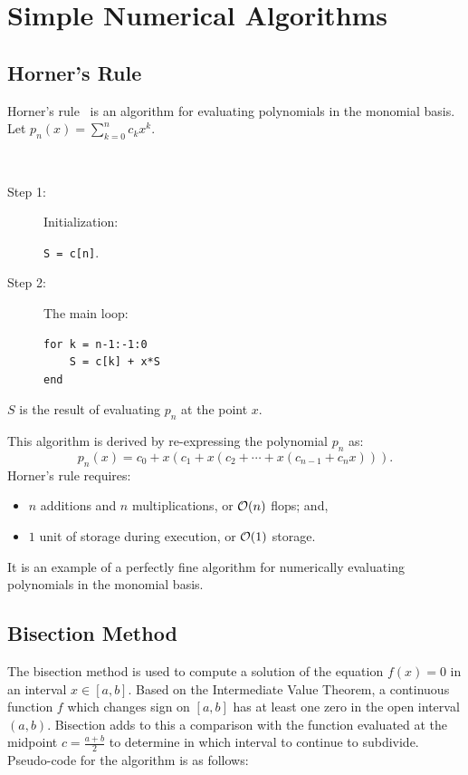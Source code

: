 \section{Simple Numerical Algorithms}

\subsection{Horner's Rule}

Horner's rule~\cite{Horner-109-308-19} is an algorithm for evaluating polynomials in the monomial basis. Let $p_n(x) = \sum_{k=0}^n c_kx^k$.
\begin{algorithm}~
\begin{description}
\item[Step 1:] Initialization:

{\tt S = c[n]}.
\item[Step 2:] The main loop:
\begin{verbatim}
for k = n-1:-1:0
    S = c[k] + x*S
end
\end{verbatim}
\end{description}
$S$ is the result of evaluating $p_n$ at the point $x$.
\end{algorithm}
This algorithm is derived by re-expressing the polynomial $p_n$ as:
\[
p_n(x) = c_0 + x(c_1 + x(c_2 + \cdots + x(c_{n-1}+c_nx))).
\]
Horner's rule requires:
\begin{itemize}
\item $n$ additions and $n$ multiplications, or $\mathcal{O}(n)$ flops; and,
\item $1$ unit of storage during execution, or $\mathcal{O}(1)$ storage.
\end{itemize}
It is an example of a perfectly fine algorithm for numerically evaluating polynomials in the monomial basis.

\subsection{Bisection Method}

The bisection method is used to compute a solution of the equation $f(x) = 0$ in an interval $x\in[a,b]$. Based on the Intermediate Value Theorem, a continuous function $f$ which changes sign on $[a,b]$ has at least one zero in the open interval $(a,b)$. Bisection adds to this a comparison with the function evaluated at the midpoint $c = \frac{a+b}{2}$ to determine in which interval to continue to subdivide. Pseudo-code for the algorithm is as follows:

